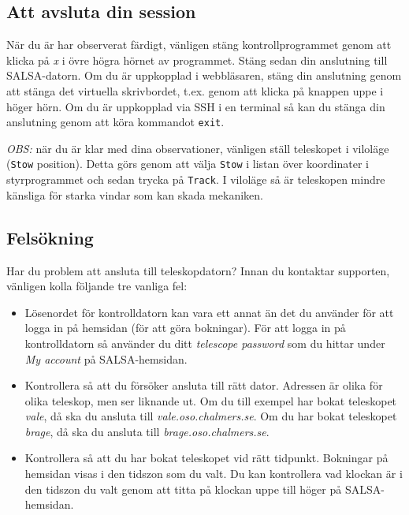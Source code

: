 \subsection{Att avsluta din session}
När du är har observerat färdigt, vänligen stäng kontrollprogrammet genom
att klicka på \emph{x} i övre högra hörnet av programmet. Stäng sedan din 
anslutning till SALSA-datorn. Om du är uppkopplad i webbläsaren, stäng din 
anslutning genom att stänga det virtuella skrivbordet, t.ex. genom att
klicka på knappen uppe i höger hörn. 
Om du är uppkopplad via SSH i en terminal så kan du stänga din anslutning
genom att köra kommandot {\tt exit}.

\emph{OBS:} när du är klar med dina observationer, vänligen ställ teleskopet i
viloläge (\verb!Stow! position). Detta görs genom att välja \verb!Stow! i listan
över koordinater i styrprogrammet och sedan trycka på \verb!Track!. I viloläge
så är teleskopen mindre känsliga för starka vindar som kan skada mekaniken. 

\subsection{Felsökning}
Har du problem att ansluta till teleskopdatorn? Innan du kontaktar supporten,
vänligen kolla följande tre vanliga fel:
\begin{itemize} 
\item Lösenordet för kontrolldatorn kan vara ett annat än det du använder för 
	att logga in på hemsidan (för att göra bokningar). För att logga in på
	kontrolldatorn så använder du ditt \emph{telescope password} som du hittar
	under \emph{My account} på SALSA-hemsidan.
\item Kontrollera så att du försöker ansluta till rätt dator. Adressen är 
	olika för olika teleskop, men ser liknande ut. Om du till exempel
	har bokat teleskopet \emph{vale}, då ska du ansluta till 
	\emph{vale.oso.chalmers.se}. Om du har bokat teleskopet \emph{brage},
	då ska du ansluta till \emph{brage.oso.chalmers.se}. 
\item Kontrollera så att du har bokat teleskopet vid rätt tidpunkt. Bokningar
	på hemsidan visas i den tidszon som du valt. Du kan kontrollera vad klockan
	är i den tidszon du valt genom att titta på klockan uppe till höger på
	SALSA-hemsidan.  
	\end{itemize}


